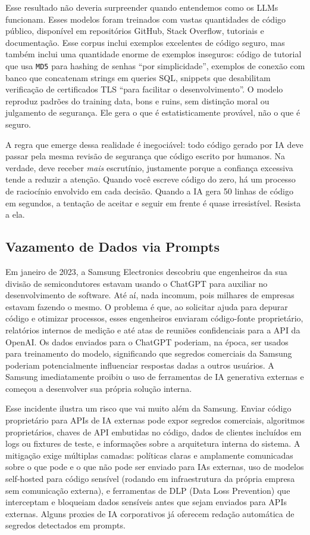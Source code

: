 Esse resultado não deveria surpreender quando entendemos como os LLMs funcionam.
Esses modelos foram treinados com vastas quantidades de código público,
disponível em repositórios GitHub, Stack Overflow, tutoriais e documentação. Esse
corpus inclui exemplos excelentes de código seguro, mas também inclui uma
quantidade enorme de exemplos inseguros: código de tutorial que usa
\texttt{MD5} para hashing de senhas ``por simplicidade'', exemplos de conexão com
banco que concatenam strings em queries SQL, snippets que desabilitam verificação
de certificados TLS ``para facilitar o desenvolvimento''. O modelo reproduz
padrões do training data, bons e ruins, sem distinção moral ou julgamento de
segurança. Ele gera o que é estatisticamente provável, não o que é seguro.

A regra que emerge dessa realidade é inegociável: todo código gerado por IA deve
passar pela mesma revisão de segurança que código escrito por humanos. Na
verdade, deve receber \emph{mais} escrutínio, justamente porque a confiança
excessiva tende a reduzir a atenção. Quando você escreve código do zero, há um
processo de raciocínio envolvido em cada decisão. Quando a IA gera 50 linhas de
código em segundos, a tentação de aceitar e seguir em frente é quase irresistível.
Resista a ela.

\subsection{Vazamento de Dados via Prompts}

Em janeiro de 2023, a Samsung Electronics descobriu que engenheiros da sua
divisão de semicondutores estavam usando o ChatGPT para auxiliar no
desenvolvimento de software. Até aí, nada incomum, pois milhares de empresas
estavam fazendo o mesmo. O problema é que, ao solicitar ajuda para depurar código
e otimizar processos, esses engenheiros enviaram código-fonte proprietário,
relatórios internos de medição e até atas de reuniões confidenciais para a API da
OpenAI. Os dados enviados para o ChatGPT poderiam, na época, ser usados para
treinamento do modelo, significando que segredos comerciais da Samsung poderiam
potencialmente influenciar respostas dadas a outros usuários. A Samsung
imediatamente proibiu o uso de ferramentas de IA generativa externas e começou a
desenvolver sua própria solução interna.

Esse incidente ilustra um risco que vai muito além da Samsung. Enviar código
proprietário para APIs de IA externas pode expor segredos comerciais, algoritmos
proprietários, chaves de API embutidas no código, dados de clientes incluídos em
logs ou fixtures de teste, e informações sobre a arquitetura interna do sistema.
A mitigação exige múltiplas camadas: políticas claras e amplamente comunicadas
sobre o que pode e o que não pode ser enviado para IAs externas, uso de modelos
self-hosted para código sensível (rodando em infraestrutura da própria empresa
sem comunicação externa), e ferramentas de DLP (Data Loss Prevention) que
interceptam e bloqueiam dados sensíveis antes que sejam enviados para APIs
externas. Alguns proxies de IA corporativos já oferecem redação automática de
segredos detectados em prompts.

